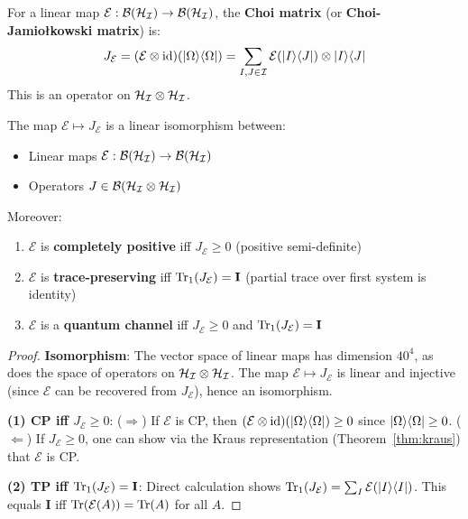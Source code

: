 \begin{definition}
\label{def:choi-matrix}
For a linear map $\mathcal{E} : \mathcal{B}(\mathcal{H}_{\mathcal{I}}) \to \mathcal{B}(\mathcal{H}_{\mathcal{I}})$, the \textbf{Choi matrix} (or \textbf{Choi-Jamio\l{}kowski matrix}) is:
\[
J_{\mathcal{E}} = (\mathcal{E} \otimes \mathrm{id})(|\Omega\rangle\langle \Omega|) = \sum_{I, J \in \mathcal{I}} \mathcal{E}(|I\rangle\langle J|) \otimes |I\rangle\langle J|
\]
This is an operator on $\mathcal{H}_{\mathcal{I}} \otimes \mathcal{H}_{\mathcal{I}}$.
\end{definition}

\begin{theorem}
\label{thm:choi-jamiolkowski}
The map $\mathcal{E} \mapsto J_{\mathcal{E}}$ is a linear isomorphism between:
\begin{itemize}
  \item Linear maps $\mathcal{E} : \mathcal{B}(\mathcal{H}_{\mathcal{I}}) \to \mathcal{B}(\mathcal{H}_{\mathcal{I}})$
  \item Operators $J \in \mathcal{B}(\mathcal{H}_{\mathcal{I}} \otimes \mathcal{H}_{\mathcal{I}})$
\end{itemize}
Moreover:
\begin{enumerate}
  \item $\mathcal{E}$ is \textbf{completely positive} iff $J_{\mathcal{E}} \geq 0$ (positive semi-definite)
  \item $\mathcal{E}$ is \textbf{trace-preserving} iff $\mathrm{Tr}_1(J_{\mathcal{E}}) = \mathbf{I}$ (partial trace over first system is identity)
  \item $\mathcal{E}$ is a \textbf{quantum channel} iff $J_{\mathcal{E}} \geq 0$ and $\mathrm{Tr}_1(J_{\mathcal{E}}) = \mathbf{I}$
\end{enumerate}
\end{theorem}

\begin{proof}
\textbf{Isomorphism}: The vector space of linear maps has dimension $40^4$, as does the space of operators on $\mathcal{H}_{\mathcal{I}} \otimes \mathcal{H}_{\mathcal{I}}$. The map $\mathcal{E} \mapsto J_{\mathcal{E}}$ is linear and injective (since $\mathcal{E}$ can be recovered from $J_{\mathcal{E}}$), hence an isomorphism.

\textbf{(1) CP iff $J_{\mathcal{E}} \geq 0$}: ($\Rightarrow$) If $\mathcal{E}$ is CP, then $(\mathcal{E} \otimes \mathrm{id})(|\Omega\rangle\langle \Omega|) \geq 0$ since $|\Omega\rangle\langle \Omega| \geq 0$. ($\Leftarrow$) If $J_{\mathcal{E}} \geq 0$, one can show via the Kraus representation (Theorem~\ref{thm:kraus}) that $\mathcal{E}$ is CP.

\textbf{(2) TP iff $\mathrm{Tr}_1(J_{\mathcal{E}}) = \mathbf{I}$}: Direct calculation shows $\mathrm{Tr}_1(J_{\mathcal{E}}) = \sum_I \mathcal{E}(|I\rangle\langle I|)$. This equals $\mathbf{I}$ iff $\mathrm{Tr}(\mathcal{E}(A)) = \mathrm{Tr}(A)$ for all $A$.
\end{proof}

